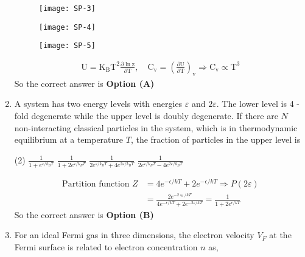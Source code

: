 \begin{enumerate}
\begin{tasks}
\task[\textbf{B.}] \begin{figure}[H]
	\centering
	\texttt{[image: SP-3]}
\end{figure}
\task[\textbf{C.}] \begin{figure}[H]
	\centering
	\texttt{[image: SP-4]}
\end{figure}
\task[\textbf{D.}] \begin{figure}[H]
	\centering
	\texttt{[image: SP-5]}
\end{figure}
\end{tasks}
\begin{answer}
\begin{align*}
\mathrm{U}=\mathrm{K}_{\mathrm{B}} \mathrm{T}^{2} \frac{\partial \ln \mathrm{z}}{\partial \mathrm{T}}, \quad \mathrm{C}_{\mathrm{v}}=\left(\frac{\partial \mathrm{U}}{\partial \mathrm{T}}\right)_{\mathrm{v}} \Rightarrow \mathrm{C}_{\mathrm{v}} \propto \mathrm{T}^{3}
\end{align*}
So the correct answer is \textbf{Option (A)}
\end{answer}
\item 	A system has two energy levels with energies $\varepsilon$ and $2 \varepsilon .$ The lower level is 4 -fold degenerate while the upper level is doubly degenerate. If there are $N$ non-interacting classical particles in the system, which is in thermodynamic equilibrium at a temperature $T$, the fraction of particles in the upper level is
{}
\begin{tasks}(2)
\task[\textbf{A.}] $\frac{1}{1+e^{\varepsilon / k_{B} T}}$
\task[\textbf{B.}] $\frac{1}{1+2 e^{\varepsilon / k_{B} T}}$
\task[\textbf{C.}] $\frac{1}{2 e^{\varepsilon / k_{B} T}+4 e^{2 \varepsilon / k_{B} T}}$
\task[\textbf{D.}] $\frac{1}{2 e^{\varepsilon / k_{B} T}-4 e^{2 \varepsilon / k_{B} T}}$
\end{tasks}
\begin{answer}
\begin{align*}
\text{Partition function }Z&=4 e^{-\epsilon / k T}+2 e^{-\epsilon / k T} \Rightarrow P(2 \varepsilon)\\&=\frac{2 e^{-2 \in / k T}}{4 e^{-\epsilon / k T}+2 e^{-2 \varepsilon / k T}}=\frac{1}{1+2 e^{\epsilon / k T}}
\end{align*}
So the correct answer is \textbf{Option (B)}
\end{answer}
\item 	For an ideal Fermi gas in three dimensions, the electron velocity $V_{F}$ at the Fermi surface is related to electron concentration $n$ as,

\end{enumerate}
